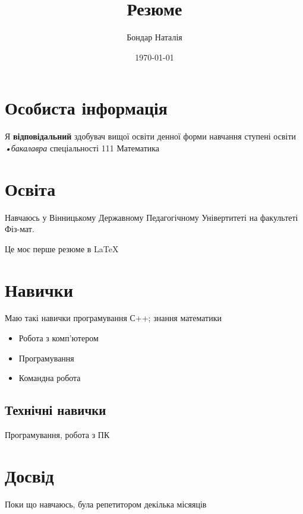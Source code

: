 \documentclass[12pt]{article}
\title{Резюме}
\author{Бондар Наталія}
\date{\today}
\begin{document}
\maketitle
\tableofcontents
\section{Особиста інформація}
Я \textbf{відповідальний} здобувач вищої освіти денної форми навчання ступені освіти \textit{•бакалавра} спеціальності 111 Математика
\section{Освіта}
Навчаюсь у Вінницькому Державному Педагогічному Універтитеті на факультеті Фіз-мат.
\begin{center}
Це моє перше резюме в LaTeX
\end{center}
\section{Навички}
Маю такі навички програмування С++; знання математики
\begin{itemize}
\item Робота з комп’ютером
\item Програмування
\item Командна робота
\end{itemize}
\subsection{Технічні навички}
Програмування, робота з ПК
\section{Досвід}
Поки що навчаюсь, була репетитором декілька місяяців
\end{document}

